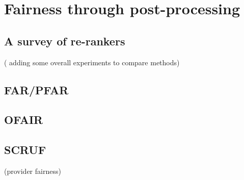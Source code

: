 \chapter{Fairness through post-processing}
\label{fairness_postproc}

\section{A survey of re-rankers} ( adding some overall experiments to compare methods)
\section{FAR/PFAR}
\section{OFAIR}
\section{SCRUF}
    (provider fairness)